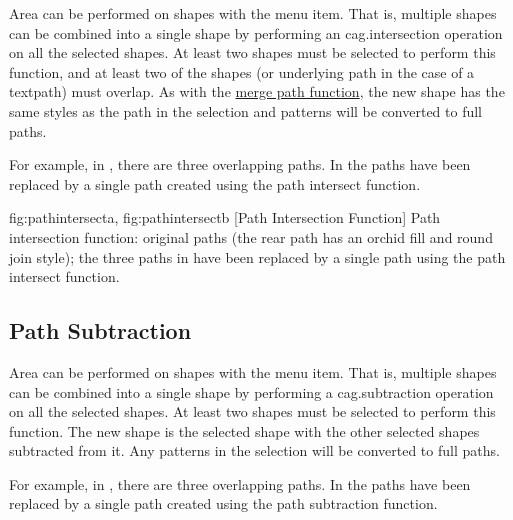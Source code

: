 
Area  can be performed on \glspl{shape} with
the  menu item. That is, multiple \glspl{shape}
can be combined into a single \gls*{shape} by performing an
\gls{cag.intersection} operation on all the selected \glspl*{shape}.  At
least two \glspl*{shape} must be selected to perform this function, 
and at least two of the shapes (or underlying path
in the case of a \gls{textpath}) must overlap.
As with the \hyperref[sec:mergepaths]{merge path function}, the new
\gls*{shape} has the same styles as the 
path in the selection and \glspl{pattern} will be converted to full
\glspl{path}.

For example, in ,
there are three overlapping paths.  In
 the paths have been replaced by
a single path created using the path intersect function.

{
  {fig:pathintersecta}{}{},
  {fig:pathintersectb}{}{}
}
[Path Intersection Function]
{Path intersection function: 
 original paths (the rear path has 
an orchid fill  and round join style); 
 the three paths 
in  have been
replaced by a single path using the path intersect function.}


\subsection{Path Subtraction}\label{sec:pathsubtract}


Area  can be performed on \glspl{shape} with
the  menu item. That is, multiple \glspl{shape}
can be combined into a single \gls*{shape} by performing a
\gls{cag.subtraction} operation on all the selected \glspl*{shape}.  At
least two \glspl*{shape} must be selected to perform this function.
The new shape is the  selected shape with
the other selected shapes subtracted from it. Any \glspl{pattern} in
the selection will be converted to full paths.

For example, in
, there are three overlapping
paths.  In  the paths have been
replaced by a single path created using the path subtraction
function.

